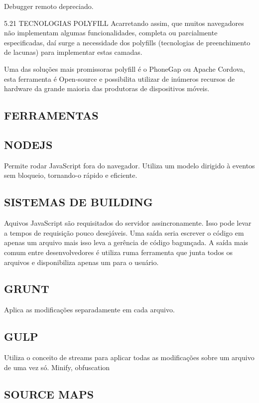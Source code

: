 \documentclass[11pt,a4paper]{article}
\begin{document}
Debugger remoto depreciado.

 5.21  TECNOLOGIAS POLYFILL
Acarretando assim, que muitos navegadores não implementam algumas funcionalidades, completa ou parcialmente especificadas, daí surge a necessidade dos polyfills (tecnologias de preenchimento de lacunas) para implementar estas camadas.

Uma das soluções mais promissoras polyfill é o PhoneGap ou Apache Cordova, esta ferramenta é Open-source e possibilita utilizar de inúmeros recursos de hardware da grande maioria das produtoras de dispositivos móveis.

\subsection{ FERRAMENTAS}

\subsection{ NODEJS}

Permite rodar JavaScript fora do navegador. Utiliza um modelo dirigido à eventos sem bloqueio, tornando-o rápido e eficiente.

\subsection{ SISTEMAS DE BUILDING}

Aquivos JavaScript são requisitados do servidor assincronamente. Isso pode levar a tempos de requisição pouco desejáveis. Uma saída seria escrever o código em apenas um arquivo mais isso leva a gerência de código bagunçada. A saída mais comum entre desenvolvedores é utiliza ruma ferramenta que junta todos os arquivos e disponibiliza apenas um para o usuário.

\subsection{ GRUNT}

Aplica as modificações separadamente em cada arquivo.

\subsection{ GULP}

Utiliza o conceito de streams para aplicar todas as modificações sobre um arquivo de uma vez só.
Minify, obfuscation

\subsection{ SOURCE MAPS}
\end{document}
